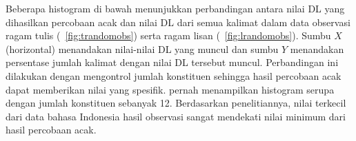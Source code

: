 Beberapa histogram di bawah menunjukkan perbandingan antara nilai DL yang dihasilkan percobaan acak dan nilai DL dari semua kalimat dalam data observasi ragam tulis (\pic~\ref{fig:trandomobs}) serta ragam lisan (\pic~\ref{fig:lrandomobs}). Sumbu $X$ (horizontal) menandakan nilai-nilai DL yang muncul dan sumbu $Y$ menandakan persentase jumlah kalimat dengan nilai DL tersebut muncul. Perbandingan ini dilakukan dengan mengontrol jumlah konstituen sehingga hasil percobaan acak dapat memberikan nilai yang spesifik. \cite{futrell2015large} pernah menampilkan histogram serupa dengan jumlah konstituen sebanyak 12. Berdasarkan penelitiannya, nilai terkecil dari data bahasa Indonesia hasil observasi sangat mendekati nilai minimum dari hasil percobaan acak.

\begin{figure}
\centering


\end{figure}
